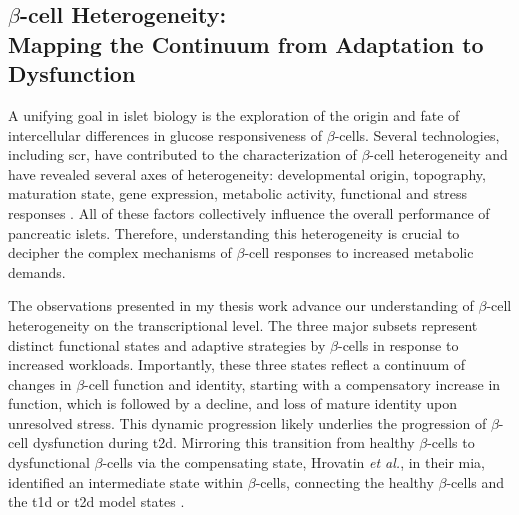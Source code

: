 \subsection[$\beta$-cell Heterogeneity: Mapping the Continuum from Adaptation to Dysfunction]{$\beta$-cell Heterogeneity:\\Mapping the Continuum from Adaptation to Dysfunction}

\vspace{20pt}
\par A unifying goal in islet biology is the exploration of the origin and fate of intercellular differences in glucose responsiveness of $\beta$-cells. Several technologies, including \gls{scr}, have contributed to the characterization of $\beta$-cell heterogeneity and have revealed several axes of heterogeneity: developmental origin, topography, maturation state, gene expression, metabolic activity, functional and stress responses \textbf{\cite{miranda_pancreatic_2021}}. All of these factors collectively influence the overall performance of pancreatic islets. Therefore, understanding this heterogeneity is crucial to decipher the complex mechanisms of $\beta$-cell responses to increased metabolic demands.

\par The observations presented in my thesis work advance our understanding of $\beta$-cell heterogeneity on the transcriptional level. The three major subsets represent distinct functional states and adaptive strategies by $\beta$-cells in response to increased workloads. Importantly, these three states reflect a continuum of changes in $\beta$-cell function and identity, starting with a compensatory increase in function, which is followed by a decline, and loss of mature identity upon unresolved stress. This dynamic progression likely underlies the progression of $\beta$-cell dysfunction during \gls{t2d}. Mirroring this transition from healthy $\beta$-cells to dysfunctional $\beta$-cells via the compensating state, Hrovatin \textit{et al.}, in their \gls{mia}, identified an intermediate state within $\beta$-cells, connecting the healthy $\beta$-cells and the \gls{t1d} or \gls{t2d} model states \textbf{\cite{hrovatin_delineating_2023}}.\\

